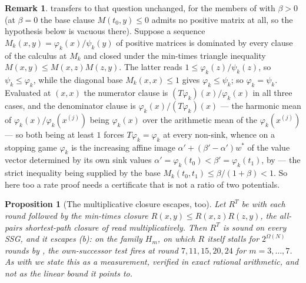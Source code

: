 \documentclass[11pt]{article}
\theoremstyle{plain}
\newtheorem{proposition}[theorem]{Proposition}
\theoremstyle{definition}
\newtheorem{remark}[theorem]{Remark}
\begin{document}
\begin{remark}
 transfers to that question unchanged, for the
members of  with $\beta>0$ (at $\beta=0$ the base
clause $M(t_0,y)\le0$ admits no positive matrix at all, so the hypothesis
below is vacuous there). Suppose a sequence
$M_k(x,y)=\varphi_k(x)/\psi_k(y)$ of positive matrices is dominated by
every clause of the calculus at $M_k$ and closed under the min-times
triangle inequality
$M(x,y)\le M(x,z)M(z,y)$. The latter reads
$1\le\varphi_k(z)/\psi_k(z)$, so $\psi_k\le\varphi_k$, while the
diagonal base $M_k(x,x)\le1$ gives $\varphi_k\le\psi_k$; so
$\varphi_k=\psi_k$. Evaluated at $(x,x)$ the numerator clause is
$(T\varphi_k)(x)/\varphi_k(x)$ in all three cases, and the denominator
clause is $\varphi_k(x)/(T\varphi_k)(x)$ --- the harmonic mean of
$\varphi_k(x)/\varphi_k(x^{(j)})$ being $\varphi_k(x)$ over the
arithmetic mean of the $\varphi_k(x^{(j)})$ --- so both being at least
$1$ forces $T\varphi_k=\varphi_k$ at every non-sink, whence on a
stopping game $\varphi_k$ is the increasing affine image
$\alpha'+(\beta'-\alpha')w^\ast$ of the value vector determined by its
own sink values $\alpha'=\varphi_k(t_0)<\beta'=\varphi_k(t_1)$, by
 --- the strict inequality being supplied by the
base $M_k(t_0,t_1)\le\beta/(1+\beta)<1$. So here too a rate proof needs a certificate
that is not a ratio of two potentials.
\end{remark}

\begin{proposition}[The multiplicative closure escapes, too]\label{prop:ratio-closure}
Let $R^{T}$ be  with each round followed by the
\emph{min-times} closure
$R(x,y)\le R(x,z)R(z,y)$, the all-pairs shortest-path closure of
 read multiplicatively. Then $R^{T}$ is sound on
every SSG, and it escapes (b): on the family
$H_m$, on which $R$ itself stalls for $2^{\Omega(N)}$ rounds by
, the own-successor test fires at round
$7,11,15,20,24$ for $m=3,\dots,7$. As with  we state
this as a measurement, verified in exact rational arithmetic, and not as
the linear bound it points to.
\end{proposition}
\end{document}
